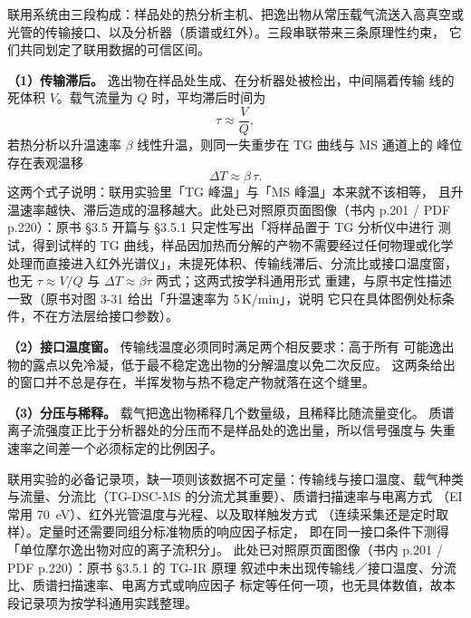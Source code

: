 \begin{principle}
联用系统由三段构成：样品处的热分析主机、把逸出物从常压载气流送入高真空或
光管的传输接口、以及分析器（质谱或红外）。三段串联带来三条原理性约束，
它们共同划定了联用数据的可信区间。

\textbf{（1）传输滞后。} 逸出物在样品处生成、在分析器处被检出，中间隔着传输
线的死体积 $V$。载气流量为 $Q$ 时，平均滞后时间为
\begin{equation}
\tau \approx \frac{V}{Q},
\label{eq:ch03b-tau}
\end{equation}
若热分析以升温速率 $\beta$ 线性升温，则同一失重步在 TG 曲线与 MS 通道上的
峰位存在表观温移
\begin{equation}
\Delta T \approx \beta\,\tau .
\label{eq:ch03b-dT}
\end{equation}
这两个式子说明：联用实验里「TG 峰温」与「MS 峰温」本来就不该相等，
且升温速率越快、滞后造成的温移越大。此处已对照原页面图像（书内 p.201 /
PDF p.220）：原书 §3.5 开篇与 §3.5.1 只定性写出「将样品置于 TG 分析仪中进行
测试，得到试样的 TG 曲线，样品因加热而分解的产物不需要经过任何物理或化学
处理而直接进入红外光谱仪」，未提死体积、传输线滞后、分流比或接口温度窗，
也无 $\tau\approx V/Q$ 与 $\Delta T\approx\beta\tau$ 两式；这两式按学科通用形式
重建，与原书定性描述一致（原书对图 3-31 给出「升温速率为 5\,K/min」，说明
它只在具体图例处标条件，不在方法层给接口参数）。

\textbf{（2）接口温度窗。} 传输线温度必须同时满足两个相反要求：高于所有
可能逸出物的露点以免冷凝，低于最不稳定逸出物的分解温度以免二次反应。
这两条给出的窗口并不总是存在，半挥发物与热不稳定产物就落在这个缝里。

\textbf{（3）分压与稀释。} 载气把逸出物稀释几个数量级，且稀释比随流量变化。
质谱离子流强度正比于分析器处的分压而不是样品处的逸出量，所以信号强度与
失重速率之间差一个必须标定的比例因子。
\end{principle}

\begin{measure}
联用实验的必备记录项，缺一项则该数据不可定量：传输线与接口温度、载气种类
与流量、分流比（TG-DSC-MS 的分流尤其重要）、质谱扫描速率与电离方式
（EI 常用 \qty{70}{eV}）、红外光管温度与光程、以及取样触发方式
（连续采集还是定时取样）。定量时还需要同组分标准物质的响应因子标定，
即在同一接口条件下测得「单位摩尔逸出物对应的离子流积分」。
此处已对照原页面图像（书内 p.201 / PDF p.220）：原书 §3.5.1 的 TG-IR 原理
叙述中未出现传输线／接口温度、分流比、质谱扫描速率、电离方式或响应因子
标定等任何一项，也无具体数值，故本段记录项为按学科通用实践整理。
\end{measure}

